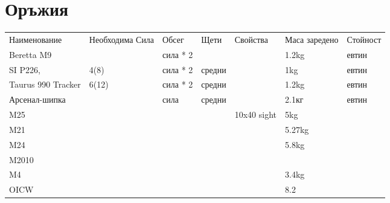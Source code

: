 \section{Оръжия}
\begin{tabular}{p{2cm} | p{2cm} | p{2cm} | p{2cm} | p{2cm} | p{2cm} | p{2cm}}
Наименование          & Необходима Сила      & Обсег      & Щети       & Свойства       & Маса заредено & Стойност         \\
Beretta M9            &                      & сила * 2   &            &                & 1.2kg         & евтин            \\  %
SI P226,              & 4(8)                 & сила * 2   & средни     &                & 1kg           & евтин            \\  %
Taurus 990 Tracker    & 6(12)                & сила * 2   & средни     &                & 1.2kg         & евтин            \\  %
Арсенал-шипка         &                      & сила       & средни     &                & 2.1кг         & евтин            \\  %
M25                   &                      &            &            & 10x40 sight    & 5kg           &                  \\  %
M21                   &                      &            &            &                & 5.27kg        &                  \\  %
M24                   &                      &            &            &                & 5.8kg         &                  \\  %
M2010                 &                      &            &            &                &               &                  \\
M4                    &                      &            &            &                & 3.4kg         &                  \\  %
OICW                  &                      &            &            &                & 8.2           &                  \\  %

\end{tabular}
